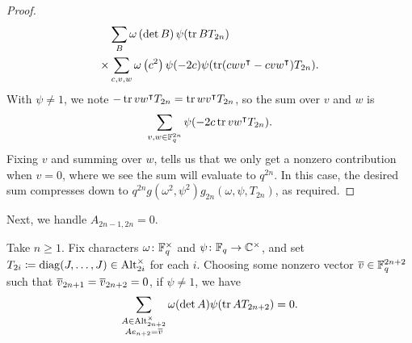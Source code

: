 \begin{proof}
\begin{align*}
        & \sum_{B}\omega\left(\det B\right)\psi(\operatorname{tr} BT_{2n}) \\
        \times{} & \sum_{c,v,w}\omega\left(c^2\right)\psi(-2c)\psi(\operatorname{tr}(cwv^\intercal-cvw^\intercal)T_{2n}).
    \end{align*}
    With $\psi\ne1$, we note $-\operatorname{tr} vw^\intercal T_{2n}=\operatorname{tr} wv^\intercal T_{2n}$, so the sum over $v$ and $w$ is
    \[\sum_{v,w\in\mathbb F_q^{2n}}\psi(-2c\operatorname{tr} vw^\intercal T_{2n}).\]
    Fixing $v$ and summing over $w$,  tells us that we only get a nonzero contribution when $v=0$, where we see the sum will evaluate to $q^{2n}$. In this case, the desired sum compresses down to $q^{2n}g\left(\omega^2,\psi^2\right)g_{2n}(\omega,\psi,T_{2n})$, as required.
\end{proof}
Next, we handle $A_{2n-1,2n}=0$.
\begin{lemma} \label{lem:gsum-alt-0}
    Take $n\ge1$. Fix characters $\omega\colon\mathbb F_q^\times$ and $\psi\colon\mathbb F_q\to\mathbb C^\times$, and set $T_{2i}\coloneqq\operatorname{diag}(J,\ldots,J)\in\operatorname{Alt}^\times_{2i}$ for each $i$. Choosing some nonzero vector $\overline{v}\in\mathbb F_q^{2n+2}$ such that $\overline{v}_{2n+1}=\overline{v}_{2n+2}=0$, if $\psi\ne1$, we have
    \[\sum_{\substack{A\in\operatorname{Alt}_{2n+2}^\times\\Ae_{n+2}=\overline{v}}}\omega(\det A)\psi(\operatorname{tr} AT_{2n+2})=0.
    \]
\end{lemma}
